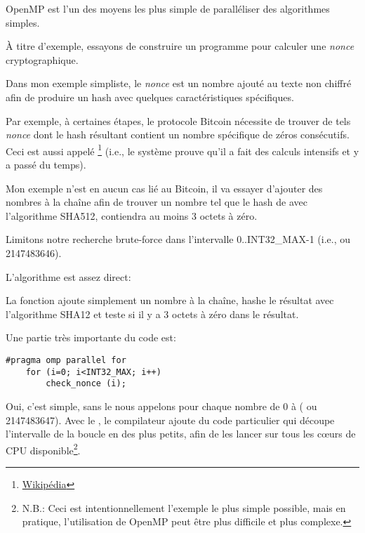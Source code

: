 \label{openmp}

OpenMP est l'un des moyens les plus simple de paralléliser des algorithmes simples.


À titre d'exemple, essayons de construire un programme pour calculer une \emph{nonce}
cryptographique.

Dans mon exemple simpliste, le \emph{nonce} est un nombre ajouté au texte non chiffré
afin de produire un hash avec quelques caractéristiques spécifiques.

Par exemple, à certaines étapes, le protocole Bitcoin nécessite de trouver de tels
\emph{nonce} dont le hash résultant contient un nombre spécifique de zéros consécutifs.
Ceci est aussi appelé 
\footnote{\href{http://go.yurichev.com/17101}{Wikipédia}}
(i.e., le système prouve qu'il a fait des calculs intensifs et y a passé du temps).

Mon exemple n'est en aucun cas lié au Bitcoin, il va essayer d'ajouter des nombres
à la chaîne afin de trouver un nombre tel que le hash de 
avec l'algorithme SHA512, contiendra au moins 3 octets à zéro.

Limitons notre recherche brute-force dans l'intervalle 0..INT32\_MAX-1 (i.e., 
ou 2147483646).

L'algorithme est assez direct:



La fonction  ajoute simplement un nombre à la chaîne, hashe le
résultat avec l'algorithme SHA12 et teste si il y a 3 octets à zéro dans le résultat.

Une partie très importante du code est:

\begin{lstlisting}[style=customc]
	#pragma omp parallel for
	for (i=0; i<INT32_MAX; i++)
		check_nonce (i);
\end{lstlisting}

Oui, c'est simple, sans le  nous appelons  pour chaque
nombre de 0 à  ( ou 2147483647).
Avec le , le compilateur ajoute du code particulier qui découpe l'intervalle
de la boucle en des plus petits, afin de les lancer sur tous les c\oe{}urs de \ac{CPU}
disponible\footnote{N.B.: Ceci est intentionnellement l'exemple le plus simple possible,
mais en pratique, l'utilisation de OpenMP peut être plus difficile et plus complexe.}.

